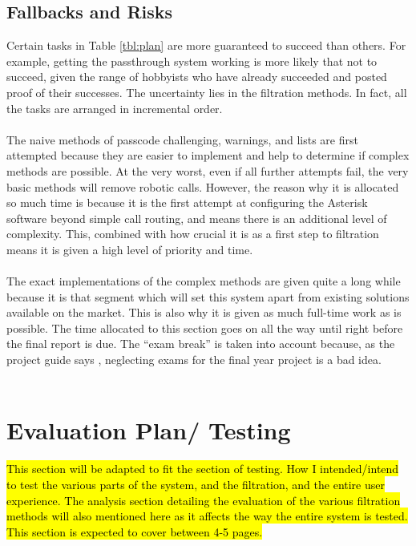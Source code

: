 \documentclass[12pt,a4paper]{report}
\begin{document}
\section{Fallbacks and Risks}
Certain tasks in Table \ref{tbl:plan} are more guaranteed to succeed than others. For example, getting the passthrough system working is more likely that not to succeed, given the range of hobbyists who have already succeeded and posted proof of their successes. The uncertainty lies in the filtration methods. In fact, all the tasks are arranged in incremental order.
\\\\
The naive methods of passcode challenging, warnings, and lists are first attempted because they are easier to implement and help to determine if complex methods are possible. At the very worst, even if all further attempts fail, the very basic methods will remove robotic calls. However, the reason why it is allocated so much time is because it is the first attempt at configuring the Asterisk software beyond simple call routing, and means there is an additional level of complexity. This, combined with how crucial it is as a first step to filtration means it is given a high level of priority and time.
\\\\
The exact implementations of the complex methods are given quite a long while because it is that segment which will set this system apart from existing solutions available on the market. This is also why it is given as much full-time work as is possible. The time allocated to this section goes on all the way until right before the final report is due. The ``exam break'' is taken into account because, as the project guide says \cite{guide}, neglecting exams for the final year project is a bad idea.
\\\\


\chapter{Evaluation Plan/ Testing}

\hl{This section will be adapted to fit the section of testing. How I intended/intend to test the various parts of the system, and the filtration, and the entire user experience. The analysis section detailing the evaluation of the various filtration methods will also mentioned here as it affects the way the entire system is tested. This section is expected to cover between 4-5 pages. }
\end{document}
